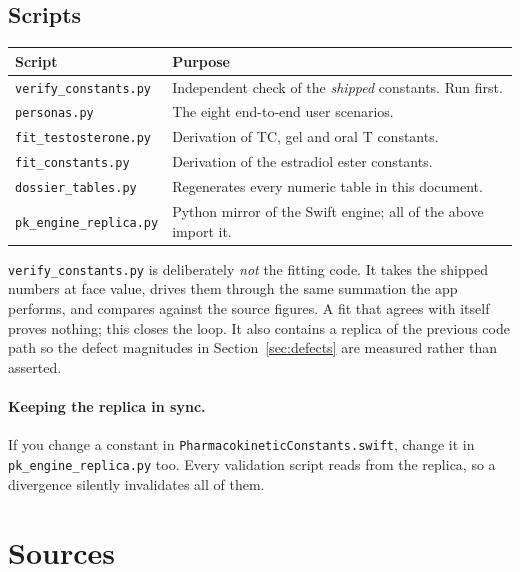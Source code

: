 \documentclass[11pt,a4paper]{article}
\newcommand{\code}[1]{\texttt{\small #1}}
\begin{document}
\subsection{Scripts}

\begin{table}[h]
\centering
\small
\begin{tabular}{@{}ll@{}}
\toprule
\textbf{Script} & \textbf{Purpose} \\
\midrule
\code{verify\_constants.py} & Independent check of the \emph{shipped} constants. Run first. \\
\code{personas.py}          & The eight end-to-end user scenarios. \\
\code{fit\_testosterone.py} & Derivation of TC, gel and oral T constants. \\
\code{fit\_constants.py}    & Derivation of the estradiol ester constants. \\
\code{dossier\_tables.py}   & Regenerates every numeric table in this document. \\
\code{pk\_engine\_replica.py} & Python mirror of the Swift engine; all of the above import it. \\
\bottomrule
\end{tabular}
\end{table}

\code{verify\_constants.py} is deliberately \emph{not} the fitting code. It takes
the shipped numbers at face value, drives them through the same summation the app
performs, and compares against the source figures. A fit that agrees with itself
proves nothing; this closes the loop. It also contains a replica of the previous
code path so the defect magnitudes in Section~\ref{sec:defects} are measured
rather than asserted.

\paragraph{Keeping the replica in sync.} If you change a constant in
\code{PharmacokineticConstants.swift}, change it in \code{pk\_engine\_replica.py}
too. Every validation script reads from the replica, so a divergence silently
invalidates all of them.

\section{Sources}
\end{document}

